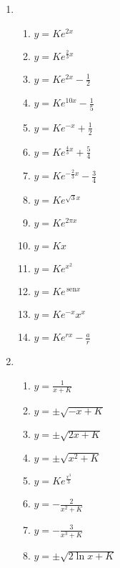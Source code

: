 \documentclass[a4paper]{article}
\providecommand{\sin}{} \renewcommand{\sin}{\hspace{2pt}\mathrm{sen}}
\begin{document}
\begin{enumerate}
\item
  \begin{enumerate}
  \item $y = Ke^{2x}$
  \item $y = Ke^{\frac{2}{3}x}$
  \item $y = Ke^{2x} - \frac{1}{2}$
  \item $y = Ke^{10x} - \frac{1}{5}$
  \item $y = Ke^{-x} + \frac{1}{2}$
  \item $y = Ke^{\frac{4}{3}x} + \frac{5}{4}$
  \item $y = Ke^{-\frac{2}{3}x} - \frac{3}{4}$
  \item $y = Ke^{\sqrt{3}x}$
  \item $y = Ke^{2\pi x}$
  \item $y = Kx$
  \item $y = Ke^{x^2}$
  \item $y = Ke^{\sin x}$
  \item $y = Ke^{-x}x^x$
  \item $y = Ke^{rx} - \frac{a}{r}$
  \end{enumerate}

\item
  \begin{enumerate}
  \item $y = \frac{1}{x + K}$
  \item $y = \pm \sqrt{-x + K}$
  \item $y = \pm \sqrt{2x + K}$
  \item $y = \pm \sqrt{x^2 + K}$
  \item $y = Ke^{\frac{x^3}{3}}$
  \item $y = -\frac{2}{x^2 + K}$
  \item $y = -\frac{3}{x^3 + K}$
  \item $y = \pm \sqrt{2\ln x +K}$
  \end{enumerate}
\end{enumerate}
\end{document}
